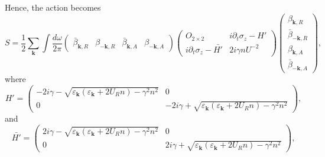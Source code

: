 \documentclass[aps,onecolumn,superscriptaddress,notitlepage,longbibliography]{revtex4-1}
\newcommand{\tmmathbf}[1]{\ensuremath{\boldsymbol{#1}}}
\begin{document}
Hence, the action becomes
\begin{equation}
  S = \frac{1}{2} \sum_{\tmmathbf{k}} \int \frac{d \omega}{2 \pi}
  \left(\begin{array}{cccc}
    \bar{\beta}_{\tmmathbf{k}, R} & \beta_{- \tmmathbf{k}, R} &
    \bar{\beta}_{\tmmathbf{k}, A} & \beta_{- \tmmathbf{k}, A}
  \end{array}\right) \left(\begin{array}{cc}
    O_{2 \times 2} & i\partial_t \sigma_z-H'\\
    i\partial_t \sigma_z-\bar{H'} & 2i \gamma n U^{-2} 
  \end{array}\right) \left(\begin{array}{c}
    \beta_{\tmmathbf{k}, R}\\
    \bar{\beta}_{- \tmmathbf{k}, R}\\
    \beta_{\tmmathbf{k}, A}\\
    \bar{\beta}_{- \tmmathbf{k}, A}
  \end{array}\right),
\end{equation}
where
\begin{equation}
  H' = \left(\begin{array}{cc}
    - 2 i \gamma - \sqrt{\varepsilon_{\tmmathbf{k}}
    (\varepsilon_{\tmmathbf{k}} + 2 U_R n) - \gamma^2 n^2} & 0\\
    0 & - 2 i \gamma + \sqrt{\varepsilon_{\tmmathbf{k}}
    (\varepsilon_{\tmmathbf{k}} + 2 U_R n) - \gamma^2 n^2}
  \end{array}\right) , \label{Eq:Hprime}
\end{equation}
and 
\begin{equation}
  \bar{H'} = \left(\begin{array}{cc}
    2 i \gamma - \sqrt{\varepsilon_{\tmmathbf{k}}
    (\varepsilon_{\tmmathbf{k}} + 2 U_R n) - \gamma^2 n^2} & 0\\
    0 &  2 i \gamma + \sqrt{\varepsilon_{\tmmathbf{k}}
    (\varepsilon_{\tmmathbf{k}} + 2 U_R n) - \gamma^2 n^2}
  \end{array}\right) ,
\end{equation}
\end{document}
